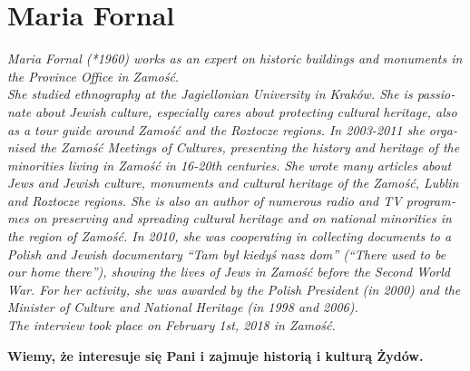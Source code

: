 \section{Maria Fornal}
\begin{otherlanguage}{ngerman}
\textit{Maria Fornal (*1960) works as an expert on historic buildings and monuments in the Province Office in Zamość. \\
She studied ethnography at the Jagiellonian University in Kraków. She is passionate about Jewish culture, especially cares about protecting cultural heritage, also as a tour guide around Zamość and the Roztocze regions. In 2003-2011 she organised the Zamość Meetings of Cultures, presenting the history and heritage of the minorities living in Zamość in 16-20th centuries. She wrote many articles about Jews and Jewish culture, monuments and cultural heritage of the Zamość, Lublin and Roztocze regions. She is also an author of numerous radio and TV programmes on preserving and spreading cultural heritage and on national minorities in the region of Zamość. In 2010, she was cooperating in collecting documents to a Polish and Jewish documentary ``Tam był kiedyś nasz dom'' (``There used to be our home there''), showing the lives of Jews in Zamość before the Second World War. For her activity, she was awarded by the Polish President (in 2000) and the Minister of Culture and National Heritage (in 1998 and 2006). \\
The interview took place on February 1st, 2018 in Zamość.}\par
\vspace*{2em}
\textbf{Wiemy, że interesuje się Pani i zajmuje historią i kulturą Żydów.}
	

\end{otherlanguage}
